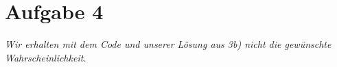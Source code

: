 \pagebreak
\section*{Aufgabe 4}

\hbox{}
\emph{Wir erhalten mit dem Code und unserer Lösung aus 3b) nicht die gewünschte Wahrscheinlichkeit.}